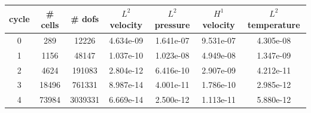 \documentclass[10pt]{report}
\begin{document}
\begin{table}[H]
\begin{center}
\begin{tabular}{|c|c|c|c|c|c|c|} \hline
cycle & \# cells & \# dofs & $L^2$ velocity & $L^2$ pressure & $H^1$ velocity & $L^2$ temperature\\ \hline
0 & 289 & 12226 & 4.634e-09 & 1.641e-07 & 9.531e-07 & 4.305e-08\\ \hline
1 & 1156 & 48147 & 1.037e-10 & 1.023e-08 & 4.949e-08 & 1.347e-09\\ \hline
2 & 4624 & 191083 & 2.804e-12 & 6.416e-10 & 2.907e-09 & 4.212e-11\\ \hline
3 & 18496 & 761331 & 8.987e-14 & 4.001e-11 & 1.786e-10 & 2.985e-12\\ \hline
4 & 73984 & 3039331 & 6.669e-14 & 2.500e-12 & 1.113e-11 & 5.880e-12\\ \hline
\end{tabular}
\end{center}
\end{table}
\end{document}
